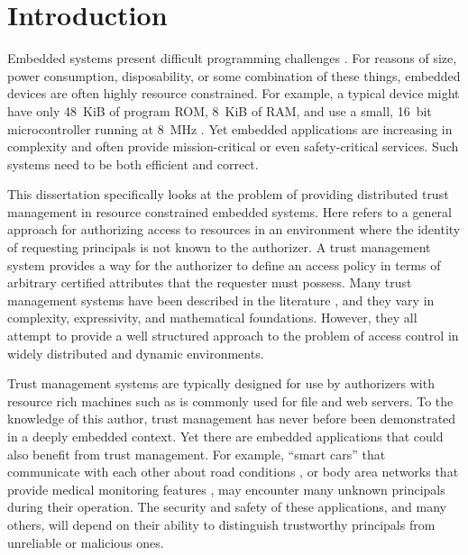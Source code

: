 \chapter{Introduction}
\label{chapter-introduction}

Embedded systems present difficult programming challenges
\cite{Mottola:2011:PWS:1922649.1922656}. For reasons of size, power consumption, disposability,
or some combination of these things, embedded devices are often highly resource constrained. For
example, a typical device might have only 48~KiB of program ROM, 8~KiB of RAM, and use a small,
16~bit microcontroller running at 8~MHz \cite{tmotesky-datasheet}. Yet embedded applications are
increasing in complexity and often provide mission-critical or even safety-critical services.
Such systems need to be both efficient and correct.

This dissertation specifically looks at the problem of providing distributed trust management in
resource constrained embedded systems. Here  refers to a general
approach for authorizing access to resources in an environment where the identity of requesting
principals is not known to the authorizer. A trust management system provides a way for the
authorizer to define an access policy in terms of arbitrary certified attributes that the
requester must possess. Many trust management systems have been described in the literature
\cite{chapin-skalka-wang-acmcs08}, and they vary in complexity, expressivity, and mathematical
foundations. However, they all attempt to provide a well structured approach to the problem of
access control in widely distributed and dynamic environments.

Trust management systems are typically designed for use by authorizers with resource rich
machines such as is commonly used for file and web servers. To the knowledge of this author,
trust management has never before been demonstrated in a deeply embedded context. Yet there are
embedded applications that could also benefit from trust management. For example, ``smart cars''
that communicate with each other about road conditions \cite{Seepold:2009:ESP:1641563.1641568},
or body area networks that provide medical monitoring features
\cite{Shnayder:2005:SNM:1098918.1098979,Chen:2011:BAN:1968858.1968873}, may encounter many
unknown principals during their operation. The security and safety of these applications, and
many others, will depend on their ability to distinguish trustworthy principals from unreliable
or malicious ones.

